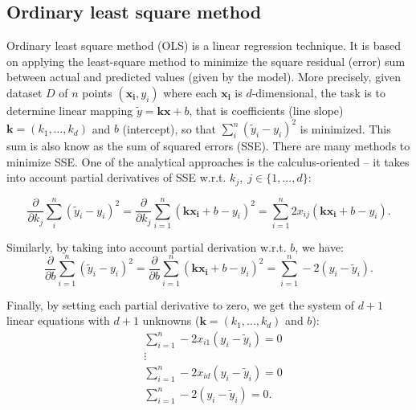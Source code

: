 \documentclass{bmcart}
\begin{document}
	\subsection{Ordinary least square method}\label{sec:ols}
Ordinary least square method (OLS) is a linear regression technique. It is based on applying the least-square method to minimize the square residual (error) sum  between actual and predicted values (given by the model). More precisely, given   dataset $D$ of $n$ points $(\mathbf{x_i}, y_i)$ where each $\mathbf{x_i}$ is $d$-dimensional, the task is to determine linear mapping $\tilde{y} = \mathbf{k} \mathbf{x} + b$, that is coefficients (line slope) $\mathbf{k} = (k_1, \ldots, k_d)$ and $b$ (intercept), so that $ \sum_{i}^{n} (\tilde{y}_i - y_i)^2 $ is minimized. This sum is also know as the sum of squared errors (SSE). There are many methods to minimize SSE. One of the analytical approaches is the calculus-oriented -- it takes into account partial derivatives of SSE w.r.t. $k_j,\; j \in \{1, ..., d\}$: 

$$  \frac{\partial}{\partial k_j} \sum_{i}^{n} (\tilde{y}_i - y_i)^2 = \frac{\partial}{\partial k_j} \sum_{i=1}^{n} ( \mathbf{k}\mathbf{x_i}+b  - y_i)^2 =  \sum_{i=1}^{n} 2x_{ij}(\mathbf{k}\mathbf{x_i} + b - y_i).$$ 

Similarly, by taking into account  partial derivation w.r.t. $b$, we have: 
$$  \frac{\partial}{\partial b} \sum_{i=1}^{n} (\tilde{y}_i - y_i)^2  = \frac{\partial}{\partial b} \sum_{i=1}^{n} ( \mathbf{k}\mathbf{x_i}+b  - y_i)^2 = \sum_{i=1}^{n} -2  (y_i - \tilde{y}_i). $$

Finally, by setting each partial derivative to zero, we get the system of $d+1$ linear equations with $d+1$ unknowns ($\mathbf{k}=(k_1, ..., k_d)$ and $b$): 
 \begin{align*}
	& \sum_{i=1}^{n} -2x_{i1} (y_i - \tilde{y}_i) = 0 \\
	& \vdots \\
	& \sum_{i=1}^{n} -2x_{id} (y_i - \tilde{y}_i) = 0 \\
	&\sum_{i=1}^{n} -2  (y_i - \tilde{y}_i) = 0.
\end{align*} 
 
\end{document}

